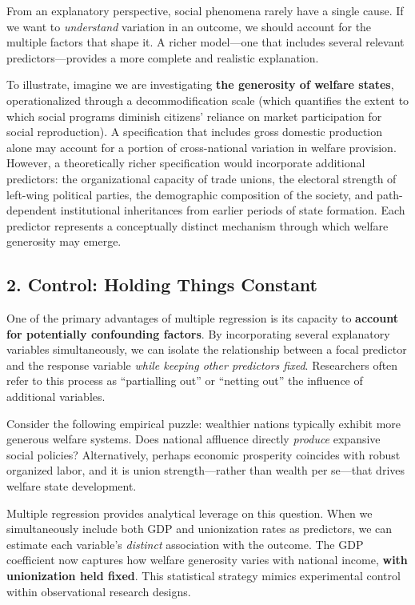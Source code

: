 \documentclass[
  letterpaper,
  DIV=11,
  numbers=noendperiod]{scrreprt}
\begin{document}
From an explanatory perspective, social phenomena rarely have a single
cause. If we want to \emph{understand} variation in an outcome, we
should account for the multiple factors that shape it. A richer
model---one that includes several relevant predictors---provides a more
complete and realistic explanation.

To illustrate, imagine we are investigating \textbf{the generosity of
welfare states}, operationalized through a decommodification scale
(which quantifies the extent to which social programs diminish citizens'
reliance on market participation for social reproduction). A
specification that includes gross domestic production alone may account
for a portion of cross-national variation in welfare provision. However,
a theoretically richer specification would incorporate additional
predictors: the organizational capacity of trade unions, the electoral
strength of left-wing political parties, the demographic composition of
the society, and path-dependent institutional inheritances from earlier
periods of state formation. Each predictor represents a conceptually
distinct mechanism through which welfare generosity may emerge.

\subsection{2. Control: Holding Things
Constant}\label{control-holding-things-constant}

One of the primary advantages of multiple regression is its capacity to
\textbf{account for potentially confounding factors}. By incorporating
several explanatory variables simultaneously, we can isolate the
relationship between a focal predictor and the response variable
\emph{while keeping other predictors fixed}. Researchers often refer to
this process as ``partialling out'' or ``netting out'' the influence of
additional variables.

Consider the following empirical puzzle: wealthier nations typically
exhibit more generous welfare systems. Does national affluence directly
\emph{produce} expansive social policies? Alternatively, perhaps
economic prosperity coincides with robust organized labor, and it is
union strength---rather than wealth per se---that drives welfare state
development.

Multiple regression provides analytical leverage on this question. When
we simultaneously include both GDP and unionization rates as predictors,
we can estimate each variable's \emph{distinct} association with the
outcome. The GDP coefficient now captures how welfare generosity varies
with national income, \textbf{with unionization held fixed}. This
statistical strategy mimics experimental control within observational
research designs.
\end{document}
